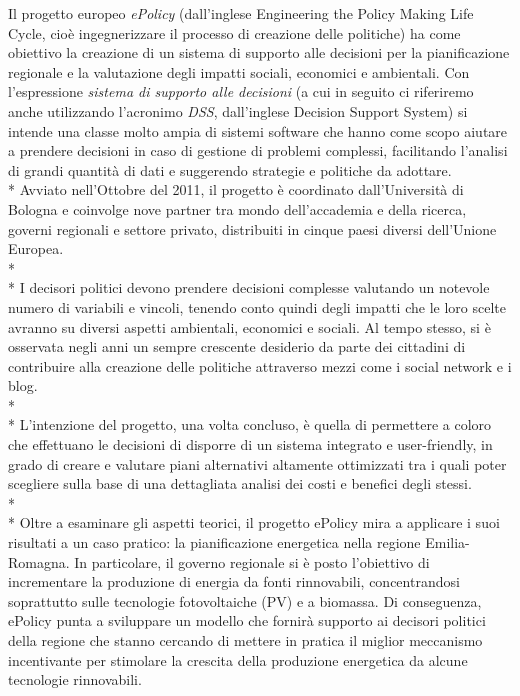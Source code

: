 \documentclass[12pt,a4paper,openright,twoside]{report}
\begin{document}
Il progetto europeo \emph{ePolicy} (dall'inglese Engineering the Policy Making Life Cycle, cioè ingegnerizzare il processo di creazione delle politiche) ha come obiettivo la creazione di un sistema di supporto alle decisioni per la pianificazione regionale e la valutazione degli impatti sociali, economici e ambientali. Con l'espressione \emph{sistema di supporto alle decisioni} (a cui in seguito ci riferiremo anche utilizzando l'acronimo \emph{DSS}, dall'inglese Decision Support System) si intende una classe molto ampia di sistemi software che hanno come scopo aiutare a prendere decisioni in caso di gestione di problemi complessi, facilitando l'analisi di grandi quantità di dati e suggerendo strategie e  politiche da adottare.\\*
Avviato nell'Ottobre del 2011, il progetto è coordinato dall'Università di Bologna e coinvolge nove partner tra mondo dell'accademia e della ricerca, governi regionali e settore privato, distribuiti in cinque paesi diversi dell'Unione Europea.\\*\\*
I decisori politici devono prendere decisioni complesse valutando un notevole numero di variabili e vincoli, tenendo conto quindi degli impatti che le loro scelte avranno su diversi aspetti ambientali, economici e sociali. Al tempo stesso, si è osservata negli anni un sempre crescente desiderio da parte dei cittadini di contribuire alla creazione delle politiche attraverso mezzi come i social network e i blog.\\*\\*
L'intenzione del progetto, una volta concluso, è quella di permettere a coloro che effettuano le decisioni di disporre di un sistema integrato e user-friendly, in grado di creare e valutare piani alternativi altamente ottimizzati tra i quali poter scegliere sulla base di una dettagliata analisi dei costi e benefici degli stessi.\\*\\*
Oltre a esaminare gli aspetti teorici, il progetto ePolicy mira a applicare i suoi risultati a un caso pratico: la pianificazione energetica nella regione Emilia-Romagna. In particolare, il governo regionale si è posto l'obiettivo di incrementare la produzione di energia da fonti rinnovabili, concentrandosi soprattutto sulle tecnologie fotovoltaiche (PV) e a biomassa. Di conseguenza, ePolicy punta a sviluppare un modello che fornirà supporto ai decisori politici della regione che stanno cercando di mettere in pratica il miglior meccanismo incentivante per stimolare la crescita della produzione energetica da alcune tecnologie rinnovabili.
\end{document}
